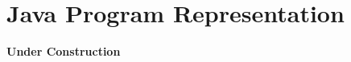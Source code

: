 \chapter{Java Program Representation}
\label{chap:program-representation}

{\bf Under Construction}

